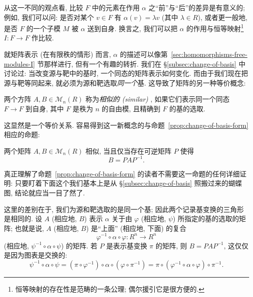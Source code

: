从这一不同的观点看, 比较 $F$ 中的元素在作用 $\alpha$ 之``前''与``后''的差异是有意义的; 例如, 我们可以问: 是否对某个 $v\in F$ 有 $\alpha(v)=\lambda v$ (其中 $\lambda\in R$), 或者更一般地, 是否 $F$ 的一个子模 $M$ 被 $\alpha$ 送到自身. 换言之, 我们可以把 $\alpha$ 的作用与恒等映射\footnote{恒等映射的存在性是范畴的一条公理; 偶尔援引它是很方便的.} $I:F\to F$ 作比较.

就矩阵表示 (在有限秩的情形) 而言, $\alpha$ 的描述可以像第~\ref{sec:homomorphisms-free-modules-I} 节那样进行, 但有一个有趣的转折. 我们在 §\ref{subsec:change-of-basis} 中讨论过: 当改变源与靶中的基时, 一个同态的矩阵表示如何变化. 而由于我们现在把源与靶等同起来, 就必须为源和靶选取\emph{同一个}基. 这导致了矩阵的另一种等价概念:

\begin{definition}\label{def:similar-matrices}
两个方阵 $A,B\in\mathcal{M}_n(R)$ 称为\emph{相似的 (similar)}
, 如果它们表示同一个同态 $F\to F$ 到自身, 其中 $F$ 是秩为 $n$ 的自由模, 且精确到 $F$ 的基的选取.
\end{definition}

这显然是一个等价关系. 容易得到这一新概念的与命题~\ref{prop:change-of-basis-form} 相应的命题:

\begin{proposition}\label{prop:similar-conjugate}
两个矩阵 $A,B\in\mathcal{M}_n(R)$ 相似, 当且仅当存在可逆矩阵 $P$ 使得
\[
B=PAP^{-1}.
\]
\end{proposition}

真正理解了命题~\ref{prop:change-of-basis-form} 的读者不需要这一命题的任何详细证明: 只要盯着下面这个我们基本上是从 §\ref{subsec:change-of-basis} 照搬过来的蝴蝶图, 结论就应当一目了然了.

\begin{center}
\end{center}

这里的差别在于, 我们为源和靶选取的是同一个基; 因此两个记录基变换的三角形是相同的. 设 $A$ (相应地, $B$) 表示 $\alpha$ 关于由 $\varphi$ (相应地, $\psi$) 所指定的基的选取的矩阵; 也就是说, $A$ (相应地, $B$) 是``上面'' (相应地, 下面) 的复合
\[
\varphi^{-1}\circ\alpha\circ\varphi:R^n\longrightarrow R^n
\]
(相应地, $\psi^{-1}\circ\alpha\circ\psi$) 的矩阵. 若 $P$ 是表示基变换 $\pi$ 的矩阵, 则 $B=PAP^{-1}$, 这仅仅是因为图表是交换的:
\[
\psi^{-1}\circ\alpha\circ\psi=(\pi\circ\varphi^{-1})\circ\alpha\circ(\varphi\circ\pi^{-1})=\pi\circ(\varphi^{-1}\circ\alpha\circ\varphi)\circ\pi^{-1}.
\]

